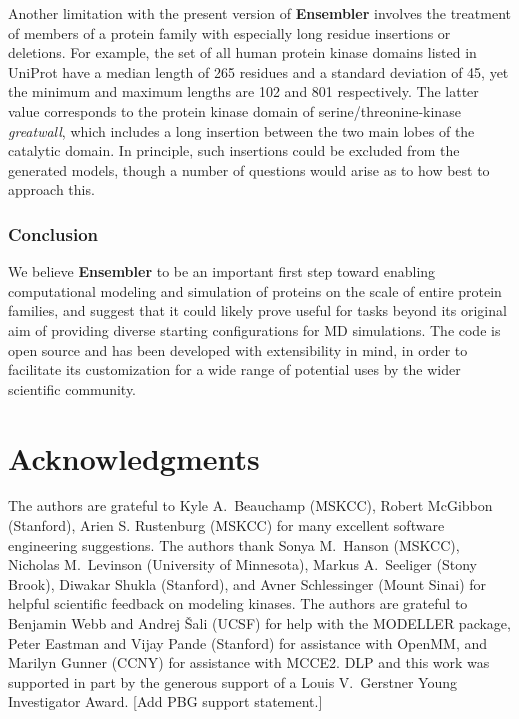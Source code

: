 \documentclass[aps,pre,twocolumn,nofootinbib,superscriptaddress,linenumbers]{revtex4-1}
\begin{document}
Another limitation with the present version of {\bf Ensembler} involves the treatment of members of a protein family with especially long residue insertions or deletions.
For example, the set of all human protein kinase domains listed in UniProt have a median length of 265 residues and a standard deviation of 45, yet the minimum and maximum lengths are 102 and 801 respectively.
The latter value corresponds to the protein kinase domain of serine/threonine-kinase \emph{greatwall}, which includes a long insertion between the two main lobes of the catalytic domain.
In principle, such insertions could be excluded from the generated models, though a number of questions would arise as to how best to approach this.

\subsubsection*{Conclusion}

We believe {\bf Ensembler} to be an important first step toward enabling computational modeling and simulation of proteins on the scale of entire protein families, and suggest that it could likely prove useful for tasks beyond its original aim of providing diverse starting configurations for MD simulations.
The code is open source and has been developed with extensibility in mind, in order to facilitate its customization for a wide range of potential uses by the wider scientific community.





\section{Acknowledgments}
\label{section:acknowledgments}

The authors are grateful to Kyle A.~Beauchamp (MSKCC), Robert McGibbon (Stanford), Arien S. Rustenburg (MSKCC) for many excellent software engineering suggestions.
The authors thank Sonya M.~Hanson (MSKCC), Nicholas M.~Levinson (University of Minnesota), Markus A.~Seeliger (Stony Brook), Diwakar Shukla (Stanford), and Avner Schlessinger (Mount Sinai) for helpful scientific feedback on modeling kinases.
The authors are grateful to Benjamin Webb and Andrej \v{S}ali (UCSF) for help with the MODELLER package, Peter Eastman and Vijay Pande (Stanford) for assistance with OpenMM, and Marilyn Gunner (CCNY) for assistance with MCCE2.
DLP and this work was supported in part by the generous support of a Louis V.~Gerstner Young Investigator Award.
{\color{red}[Add PBG support statement.]}
\end{document}
